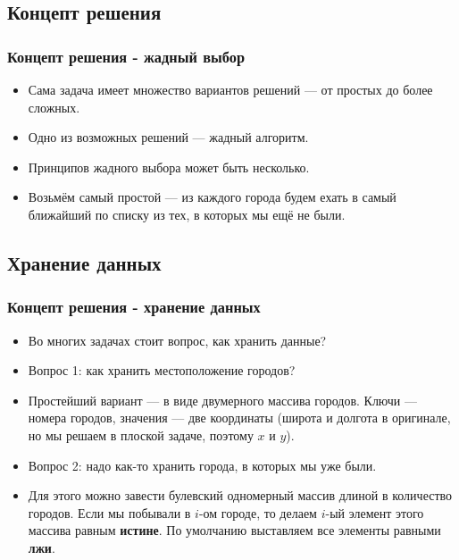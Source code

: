 \documentclass[compress,red]{beamer}
\begin{document}
\subsection{Концепт решения}
\begin{frame}[fragile]
  \frametitle{Концепт решения - жадный выбор}
	\begin{itemize}
		\item Сама задача имеет множество вариантов решений --- от простых до более сложных.
		\item Одно из возможных решений --- жадный алгоритм. 
		\item Принципов жадного выбора может быть несколько.
		\item Возьмём самый простой --- из каждого города будем ехать в самый ближайший по списку из тех, в которых мы ещё не были.
	\end{itemize}
\end{frame}

\subsection{Хранение данных}
\begin{frame}[fragile]
  \frametitle{Концепт решения - хранение данных}
	\begin{itemize}
		\item Во многих задачах стоит вопрос, как хранить данные?
		\item Вопрос 1: как хранить местоположение городов?
		\item Простейший вариант --- в виде двумерного массива городов. Ключи --- номера городов, значения --- две координаты (широта и долгота в оригинале, но мы решаем в плоской задаче, поэтому $x$ и $y$).
		\item Вопрос 2: надо как-то хранить города, в которых мы уже были.
		\item Для этого можно завести булевский одномерный массив длиной в количество городов. Если мы побывали в $i$-ом городе, то делаем $i$-ый элемент этого массива равным \textbf{истине}. По умолчанию выставляем все элементы равными \textbf{лжи}.
	\end{itemize}
\end{frame}
\end{document}
